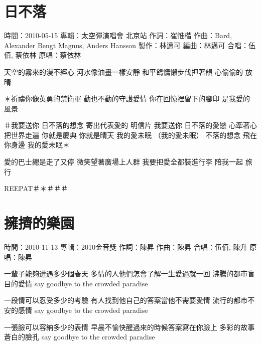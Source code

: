 \documentclass[UTF8,a4paper,oneside,twocolumn,12pt]{ctexbook}
\newcommand{\infopair}[2]{\textbullet #1：#2}
\newcommand{\zc}[1][伍佰]{\infopair{作詞}{#1}}
\newcommand{\zq}[1][伍佰]{\infopair{作曲}{#1}}
\newcommand{\bq}[1][伍佰]{\infopair{編曲}{#1}}
\newcommand{\zj}[1]{\infopair{專輯}{#1}}
\newcommand{\zz}[1]{\infopair{製作}{#1}}
\newcommand{\yc}[1]{\infopair{原唱}{#1}}
\newcommand{\sj}[1]{\infopair{時間}{#1}}
\newenvironment{info}{\begin{flushleft}\kaishu
	}
	{\end{flushleft}\normalsize\yahei\par}
\newenvironment{lyric}{
	}
{}
\begin{document}
\section{日不落}
\begin{info}
	\sj{2010-05-15}
	\zj{太空彈演唱會 北京站}
	\zc[崔惟楷]
	\zq[Bard, Alexander Bengt Magnus, Anders Hansson]
	\zz{林邁可}
	\bq[林邁可]
	\infopair{合唱}{伍佰, 蔡依林}
	\yc{蔡依林}
\end{info}
\begin{lyric}
	天空的霧來的漫不經心
	河水像油畫一樣安靜
	和平鴿慵懶步伐押著韻
	心偷偷的 放晴

	＊祈禱你像英勇的禁衛軍
	動也不動的守護愛情
	你在回憶裡留下的腳印
	是我愛的 風景

	＃我要送你 日不落的想念
	寄出代表愛的 明信片
	我要送你 日不落的愛戀
	心牽著心 把世界走遍
	你就是慶典 你就是晴天 我的愛未眠 （我的愛未眠）
	不落的想念 飛在你身邊 我的愛未眠＊

	愛的巴士總是走了又停
	微笑望著廣場上人群
	我要把愛全都裝進行李
	陪我一起 旅行

	REEPAT＃＊＃＃＃
\end{lyric}

\section{擁擠的樂園} %
\begin{info}
	\sj{2010-11-13}
	\zj{2010金音獎}
	\zc[陳昇]
	\zq[陳昇]
	\infopair{合唱}{伍佰, 陳升}
	\yc{陳昇}
\end{info}
\begin{lyric}
	一輩子能夠遭遇多少個春天
	多情的人他們怎會了解一生愛過就一回
	沸騰的都市盲目的愛情
	say goodbye to the crowded paradise

	一段情可以忍受多少的考驗
	有人找到他自己的答案當他不需要愛情
	流行的都市不安的感情
	say goodbye to the crowded paradise

	一張臉可以容納多少的表情
	早晨不愉快醒過來的時候答案寫在你臉上
	多彩的故事蒼白的臉孔
	say goodbye to the crowded paradise
\end{lyric}
\end{document}
